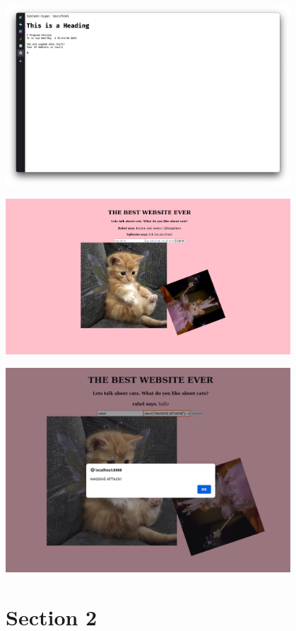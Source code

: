 \documentclass[aspectratio=169]{beamer}
\begin{document}
\begin{frame}[c]{}
  \centering
\includegraphics[width=0.8\textwidth]{05_firstCGI.png} %
\end{frame}

\begin{frame}[c]{}
  \centering
\includegraphics[width=0.8\textwidth]{06_ephi_app.png}
\end{frame}

\begin{frame}[c]{}
  \centering
\includegraphics[width=0.8\textwidth]{07_css.png}
\end{frame}


\section{Section 2}

\begin{frame}[t,plain]
\end{frame}
\end{document}

